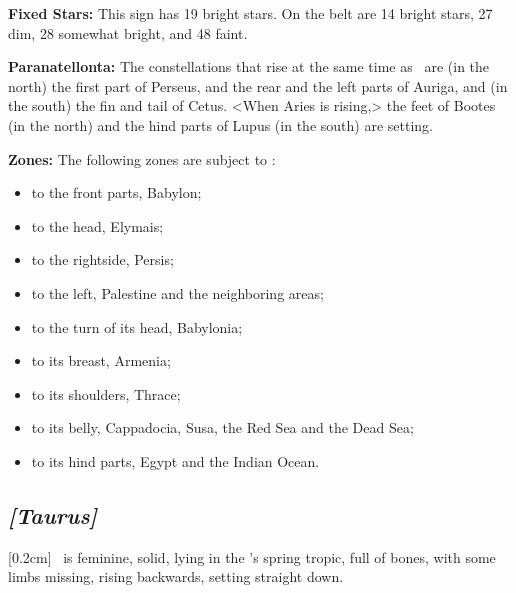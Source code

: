 \textbf{Fixed Stars:} This sign has 19 bright stars. On the belt are 14 bright stars, 27 dim, 28 somewhat bright, and 48 faint. 

\textbf{Paranatellonta:} The constellations that rise at the same time as \Aries\, are (in the north) the first part of Perseus, and the rear and the left parts of Auriga, and (in the south) the fin and tail of Cetus. <When Aries is rising,> the feet of Bootes (in the north) and the hind parts of Lupus (in the south) are setting.

\textbf{Zones:} The following zones are subject to \Aries: 
\begin{itemize}
\item to the front parts, Babylon; 
\item to the head, Elymais; 
\item to the rightside, Persis; 
\item to the left, Palestine and the neighboring areas; 
\item to the turn of its head, Babylonia; 
\item to its breast, Armenia; 
\item to its shoulders, Thrace; 
\item to its belly, Cappadocia, Susa, the Red Sea and the Dead Sea; 
\item to its hind parts, Egypt and the Indian Ocean.
\end{itemize}

\secbr
\subsection{\textit{[Taurus]}}
[0.2cm]
 \Taurus\, is  feminine,  solid, lying in the \Sun’s spring tropic, full of bones, with some limbs missing, rising backwards, setting straight down. 

